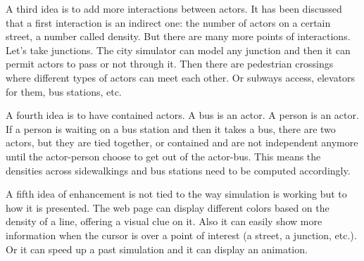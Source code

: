 \documentclass[conference]{IEEEtran}
\begin{document}
A third idea is to add more interactions between actors. It has been discussed that a first interaction is an indirect one: the number of actors on a certain street, a number called density. But there are many more points of interactions. Let's take junctions. The city simulator can model any junction and then it can permit actors to pass or not through it. Then there are pedestrian crossings where different types of actors can meet each other. Or subways access, elevators for them, bus stations, etc.

A fourth idea is to have contained actors. A bus is an actor. A person is an actor. If a person is waiting on a bus station and then it takes a bus, there are two actors, but they are tied together, or contained and are not independent anymore until the actor-person choose to get out of the actor-bus. This means the densities across sidewalkings and bus stations need to be computed accordingly.

A fifth idea of enhancement is not tied to the way simulation is working but to how it is presented. The web page can display different colors based on the density of a line, offering a visual clue on it. Also it can easily show more information when the cursor is over a point of interest (a street, a junction, etc.). Or it can speed up a past simulation and it can display an animation.


\vspace{12pt}
\end{document}
